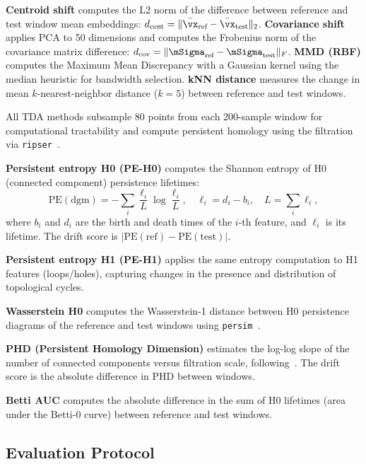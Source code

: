 \textbf{Centroid shift} computes the L2 norm of the difference between reference and test window mean embeddings: $d_{\text{cent}} = \|\bar{\vx}_{\text{ref}} - \bar{\vx}_{\text{test}}\|_2$. \textbf{Covariance shift} applies PCA to 50 dimensions and computes the Frobenius norm of the covariance matrix difference: $d_{\text{cov}} = \|\mSigma_{\text{ref}} - \mSigma_{\text{test}}\|_F$. \textbf{MMD (RBF)} computes the Maximum Mean Discrepancy with a Gaussian kernel using the median heuristic for bandwidth selection. \textbf{kNN distance} measures the change in mean $k$-nearest-neighbor distance ($k=5$) between reference and test windows.

All TDA methods subsample 80 points from each 200-sample window for computational tractability and compute persistent homology using the \vrfilt filtration via \texttt{ripser}~\cite{tralie2019ripser}.

\textbf{Persistent entropy H0 (PE-H0)} computes the Shannon entropy of H0 (connected component) persistence lifetimes:
\begin{equation}
    \text{PE}(\text{dgm}) = -\sum_{i} \frac{\ell_i}{L} \log \frac{\ell_i}{L}, \quad \ell_i = d_i - b_i, \quad L = \sum_i \ell_i,
    \label{eq:pe}
\end{equation}
where $b_i$ and $d_i$ are the birth and death times of the $i$-th feature, and $\ell_i$ is its lifetime. The drift score is $|{\text{PE}(\text{ref}) - \text{PE}(\text{test})}|$.

\textbf{Persistent entropy H1 (PE-H1)} applies the same entropy computation to H1 features (loops/holes), capturing changes in the presence and distribution of topological cycles.

\textbf{Wasserstein H0} computes the Wasserstein-1 distance between H0 persistence diagrams of the reference and test windows using \texttt{persim}~\cite{tralie2019ripser}.

\textbf{PHD (Persistent Homology Dimension)} estimates the log-log slope of the number of connected components versus filtration scale, following~\citet{wei2025shortphd}. The drift score is the absolute difference in PHD between windows.

\textbf{Betti AUC} computes the absolute difference in the sum of H0 lifetimes (area under the Betti-0 curve) between reference and test windows.

\subsection{Evaluation Protocol}
\label{sec:eval}

